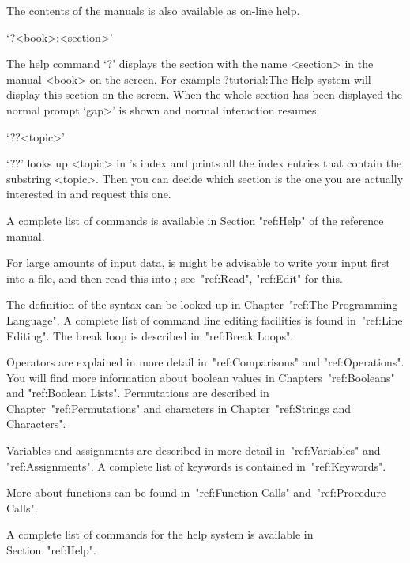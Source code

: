 
The contents of the {\GAP} manuals is also available as on-line help.

`?<book>:<section>'

The help command `?' displays the section  with the name <section> in the
manual <book> on the screen.  For example
\begintt
    ?tutorial:The Help system
\endtt
will display this section on the screen.  When the whole section has been
displayed  the normal {\GAP}  prompt  `gap>' is  shown and normal  {\GAP}
interaction resumes.

`??<topic>'

`??' looks up <topic> in {\GAP}'s index and prints  all the index entries
that contain the substring <topic>.  Then you can decide which section is
the one you are actually interested in and request this one.

A complete   list  of commands is   available  in Section  "ref:Help" of  the
reference manual.

\null

For large amounts of input data, is might be advisable to write your
input first into a file, and then read this into {\GAP};
see~"ref:Read", "ref:Edit" for this.

The definition of the {\GAP} syntax can be looked up in
Chapter~"ref:The Programming Language".
A complete list of command line editing facilities is found
in~"ref:Line Editing".
The break loop is described in~"ref:Break Loops".

Operators are explained in more detail in~"ref:Comparisons" and
"ref:Operations".
You will find more information about boolean values in
Chapters~"ref:Booleans" and "ref:Boolean Lists".
Permutations are described in Chapter~"ref:Permutations" and characters
in Chapter~"ref:Strings and Characters".

Variables and assignments are described in more detail in~"ref:Variables"
and "ref:Assignments".
A complete list of keywords is contained in~"ref:Keywords".

More about functions can be found in~"ref:Function Calls"
and~"ref:Procedure Calls".

A complete list of commands for the help system is available in
Section~"ref:Help".

